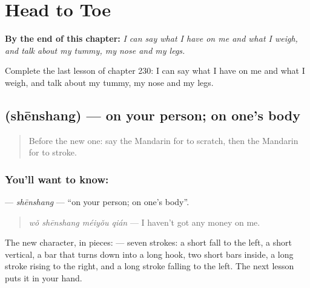 
\chapter{Head to Toe}
\label{ch:zh-head-to-toe}

\begin{chapteropening}
\textbf{By the end of this chapter:} \emph{I can say what I have on me and what I weigh, and talk about my tummy, my nose and my legs.}

Complete the last lesson of chapter 230: I can say what I have on me and what I weigh, and talk about my tummy, my nose and my legs.
\end{chapteropening}

\section[\texorpdfstring{\zh{身上} (shēnshang)}{身上 (shēnshang)}]{ (shēnshang) — on your person; on one's body}

\label{lesson:ZH-C230-shenshang}



\begin{quote}
Before the new one: say the Mandarin for to scratch, then the Mandarin for to stroke.
\end{quote}

\subsection*{You'll want to know: }
\textbf{} — \emph{shēnshang} — \textquotedblleft{}on your person; on one's body\textquotedblright{}.

\begin{quote}
\textbf{} \emph{wǒ shēnshang méiyǒu qián} — I haven't got any money on me.
\end{quote}

The new character, in pieces:  — seven strokes: a short fall to the left, a short vertical, a bar that turns down into a long hook, two short bars inside, a long stroke rising to the right, and a long stroke falling to the left. The next lesson puts it in your hand.

